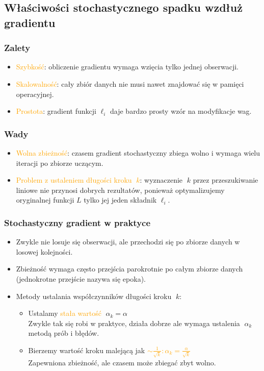 \subsection{Właściwości stochastycznego spadku wzdłuż gradientu}

\subsubsection{Zalety}
\begin{itemize}
\item \textcolor{orange}{Szybkość}: obliczenie gradientu wymaga wzięcia tylko jednej
obserwacji.
\item \textcolor{orange}{Skalowalność}: cały zbiór danych nie musi nawet znajdować się
w pamięci operacyjnej.
\item \textcolor{orange}{Prostota}: gradient funkcji  $\ell_{i}$ daje bardzo prosty wzór na
modyfikacje wag.
\end{itemize}

\subsubsection{Wady}
\begin{itemize}
\item \textcolor{orange}{Wolna zbieżność}: czasem gradient stochastyczny zbiega wolno
i wymaga wielu iteracji po zbiorze uczącym.
\item \textcolor{orange}{Problem z ustaleniem długości kroku $k$}: wyznaczenie $k$
przez przeszukiwanie liniowe nie przynosi dobrych rezultatów,
ponieważ optymalizujemy oryginalnej funkcji $L$ tylko jej jeden
składnik $\ell_{i}$.
\end{itemize}

\subsubsection{Stochastyczny gradient w praktyce}

\begin{itemize}
\item Zwykle nie losuje się obserwacji, ale przechodzi się po zbiorze
danych w losowej kolejności.
\item Zbieżność wymaga często przejścia parokrotnie po całym
zbiorze danych (jednokrotne przejście nazywa się epoka).
\item Metody ustalania współczynników długości kroku $k$:
\begin{itemize}
\item Ustalamy \textcolor{orange}{stała wartość} $\alpha_{k} = \alpha$ \\ Zwykle tak się robi w praktyce, działa dobrze ale wymaga ustalenia $\alpha_{k}$ metodą prób i błędów.
\item Bierzemy wartość kroku malejącą jak \textcolor{orange}{$\sim \frac{1}{\sqrt{k}}: \alpha_{k} = \frac{\alpha}{\sqrt{k}}$} \\
 Zapewniona zbieżność, ale czasem może zbiegać zbyt wolno.
\end{itemize}
\end{itemize}